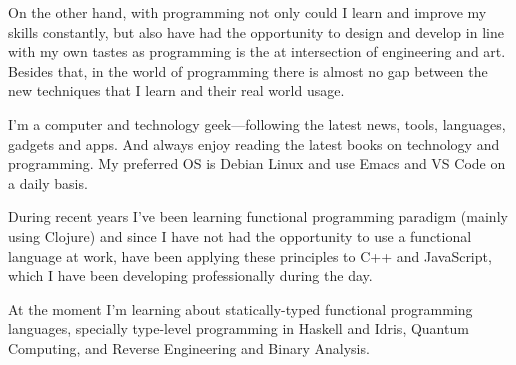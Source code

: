 \documentclass[a4paper,10pt]{article}
\begin{document}
On the other hand, with programming not only could I learn and improve my skills constantly, but also have had the opportunity to design and develop in line with my own tastes as programming is the at intersection of engineering and art. Besides that, in the world of programming there is almost no gap between the new techniques that I learn and their real world usage.

I'm a computer and technology geek---following the latest news, tools, languages, gadgets and apps. And always enjoy reading the latest books on technology and programming. My preferred OS is Debian Linux and use Emacs and VS Code on a daily basis.

During recent years I've been learning functional programming paradigm (mainly using Clojure) and since I have not had the opportunity to use a functional language at work, have been applying these principles to C++ and JavaScript, which I have been developing professionally during the day.

At the moment I'm learning about statically-typed functional programming languages, specially type-level programming in Haskell and Idris, Quantum Computing, and Reverse Engineering and Binary Analysis.
\end{document}
